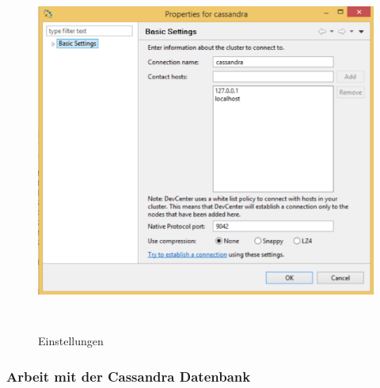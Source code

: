 \documentclass[a4paper, 12pt]{scrartcl}
\begin{document}
\begin{description}
\begin{enumerate}
\begin{figure}[H]
\centering
\includegraphics[height=12cm, width=15cm, keepaspectratio]{cass7.png}
\caption{Einstellungen}
\end{figure}    
     

   \end{enumerate}  
  
\end{description}

\subsubsection{Arbeit mit der Cassandra Datenbank}
\end{document}
